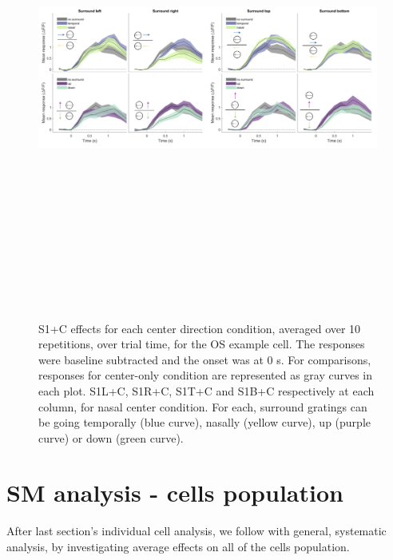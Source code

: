 \begin{figure}[H] \centering \includegraphics[width=15.9cm,height=15.9cm,keepaspectratio]{Figures/7.Results/individualSM/roi_46_mf379_pos2/4.png} 
\caption{S1+C effects for each center direction condition, averaged over 10 repetitions, over trial time, for the OS example cell. The responses were baseline subtracted and the onset was at 0 s. For comparisons, responses for center-only condition are represented as gray curves in each plot.
S1L+C, S1R+C, S1T+C and S1B+C respectively at each column, for nasal center condition. For each, surround gratings can be going temporally (blue curve), nasally (yellow curve), up (purple curve) or down (green curve).}
\label{OSexamplecellSM}
\end{figure}

\section{SM analysis - cells population}

After last section's individual cell analysis, we follow with general, systematic analysis, by investigating average effects on all of the cells population.

